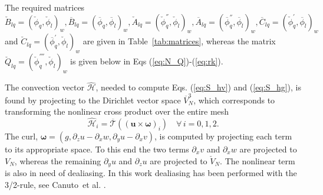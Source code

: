 \documentclass[preprint]{elsarticle}
\newcommand{\N}[1]{\check{#1}}
\newcommand{\D}[1]{\overline{#1}}
\begin{document}
The required matrices $ \N{B}_{lq} = \left( \N{\phi}_q, 
\N{\phi}_l\right)_w, \D{B}_{lq} = \left( \D{\phi}_q, 
\D{\phi}_l\right)_w, \N{A}_{lq} = \left( \N{\phi}_q^{''}, 
\N{\phi}_l\right)_w, 
\D{A}_{lq} = \left( \D{\phi}_q^{''}, \D{\phi}_l\right)_w 
, \D{C}_{lq} = \left(\N{\phi}_q^{'}, \D{\phi}_l\right)_w$ and 
$ \N{C}_{lq} = \left(\D{\phi}_q^{'}, \N{\phi}_l\right)_w$ are given in Table~\ref{tab:matrices}, whereas the matrix $\N{Q}_{lq} = \left(\N{\phi}^{''''}_q, \N{\phi}_l\right)_w$ is given below in Eqs (\ref{eq:N_Q})-(\ref{eq:rk}). 

The convection vector $\bm{\hat{\mathcal{H}}}$, needed to compute Eqs. (\ref{eq:S_hv}) and (\ref{eq:S_hg}), is found by projecting to the Dirichlet vector space $\D{V}_N^3$, which corresponds to transforming the nonlinear cross product over the entire mesh
\begin{equation}
\bm{\hat{\mathcal{H}}}_i = \mathcal{\D{T}}((\bm{u} \times \bm{\omega})_i) \quad \forall \, i=0,1,2. \label{eq:H_hat}
\end{equation}
The curl, $\bm{\omega} = (g, \partial_z u - \partial_x w, \partial_y u - \partial_x v)$, is computed by projecting each term to its appropriate space. To this end the two terms $\partial_x v$ and $\partial_x w$ are projected to $V_N$, whereas the remaining $\partial_y u$ and $\partial_z u$ are projected to $\N{V}_N$. The nonlinear term is also in need of dealiasing. In this work dealiasing has been performed with the 3/2-rule, see Canuto~et al. \cite{canuto1988}.
\end{document}
